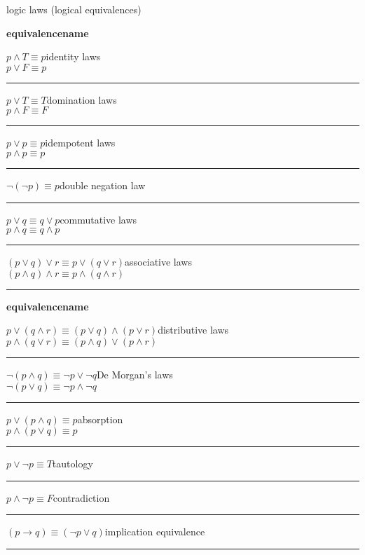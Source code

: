 \documentclass{article}
\newcommand{\logicLaw}[3]{
    \noindent\parbox{\linewidth}{
        #1\hfill #3\\
        #2
        \par
        \vspace{.5\baselineskip}
        \hrule
        \vspace{.5\baselineskip}
    }
}
\newcommand{\twoFields}[2]{
    \noindent
    \textbf{#1}\hfill\textbf{#2} \\
    \par
}
\newcommand{\sectionTitle}[1]{
    \begin{center}
        \large #1
    \end{center}
}
\begin{document}
\sectionTitle{logic laws (logical equivalences)}
\begin{multicols}{2}
    \raggedcolumns
    \twoFields{equivalence}{name}
    \logicLaw
        {$p\land T\equiv p$}
        {$p\lor F\equiv p$}
        {identity laws}
    \logicLaw
        {$p\lor T\equiv T$}
        {$p\land F\equiv F$}
        {domination laws}
    \logicLaw
        {$p\lor p\equiv p$}
        {$p\land p\equiv p$}
        {idempotent laws}
    \logicLaw
        {$\neg(\neg p)\equiv p$}
        {}
        {double negation law}
    \logicLaw
        {$p\lor q\equiv q\lor p$}
        {$p\land q\equiv q\land p$}
        {commutative laws}
    \logicLaw
        {$(p\lor q)\lor r\equiv p\lor (q\lor r)$}
        {$(p\land q)\land r\equiv p\land (q\land r)$}
        {associative laws}
    \twoFields{equivalence}{name}
    \logicLaw
        {$p\lor (q\land r)\equiv (p\lor q)\land (p\lor r)$}
        {$p\land (q\lor r)\equiv (p\land q)\lor (p\land r)$}
        {distributive laws}
    \logicLaw
        {$\neg(p\land q)\equiv\neg p\lor\neg q$}
        {$\neg(p\lor q)\equiv\neg p\land\neg q$}
        {De Morgan's laws}
    \logicLaw
        {$p\lor(p\land q)\equiv p$}
        {$p\land(p\lor q)\equiv p$}
        {absorption}
    \logicLaw
        {$p\lor\neg p\equiv T$}
        {}
        {tautology}
    \logicLaw
        {$p\land\neg p\equiv F$}
        {}
        {contradiction}
    \logicLaw
        {$(p\rightarrow q)\equiv(\neg p\lor q)$}
        {}
        {implication equivalence}
\end{multicols}
\vspace{-1.5\baselineskip}
\end{document}

